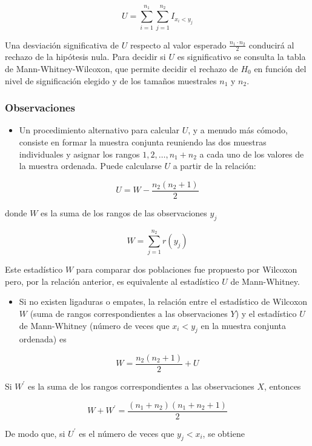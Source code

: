 \documentclass[
]{article}
\providecommand{\tightlist}{%
  \setlength{\itemsep}{0pt}\setlength{\parskip}{0pt}}
\begin{document}
\[
U=\sum_{i=1}^{n_{1}} \sum_{j=1}^{n_{2}} I_{x_{i}<y_{j}}
\]

Una desviación significativa de \(U\) respecto al valor esperado \(\frac{n_{1} \cdot n_{2}}{2}\) conducirá al rechazo de la hipótesis nula. Para decidir si \(U\) es significativo se consulta la tabla de Mann-Whitney-Wilcoxon, que permite decidir el rechazo de \(H_{0}\) en función del nivel de significación elegido y de los tamaños muestrales \(n_{1}\) y \(n_{2}\).

\subsubsection{Observaciones}\label{observaciones-4}

\begin{itemize}
\tightlist
\item
  Un procedimiento alternativo para calcular \(U\), y a menudo más cómodo, consiste en formar la muestra conjunta reuniendo las dos muestras individuales y asignar los rangos \(1,2, \ldots, n_{1}+n_{2}\) a cada uno de los valores de la muestra ordenada. Puede calcularse \(U\) a partir de la relación:
\end{itemize}

\[
U=W-\frac{n_{2}\left(n_{2}+1\right)}{2}
\]

donde \(W\) es la suma de los rangos de las observaciones \(y_{j}\)

\[
W=\sum_{j=1}^{n_{2}} r\left(y_{j}\right)
\]

Este estadístico \(W\) para comparar dos poblaciones fue propuesto por Wilcoxon pero, por la relación anterior, es equivalente al estadístico \(U\) de Mann-Whitney.

\begin{itemize}
\tightlist
\item
  Si no existen ligaduras o empates, la relación entre el estadístico de Wilcoxon \(W\) (suma de rangos correspondientes a las observaciones \(Y\)) y el estadístico \(U\) de Mann-Whitney (número de veces que \(x_{i}<y_{j}\) en la muestra conjunta ordenada) es
\end{itemize}

\[
W=\frac{n_{2}\left(n_{2}+1\right)}{2}+U
\]

Si \(W^{\prime}\) es la suma de los rangos correspondientes a las observaciones \(X\), entonces

\[
W+W^{\prime}=\frac{\left(n_{1}+n_{2}\right)\left(n_{1}+n_{2}+1\right)}{2}
\]

De modo que, si \(U^{\prime}\) es el número de veces que \(y_{j}<x_{i}\), se obtiene
\end{document}
